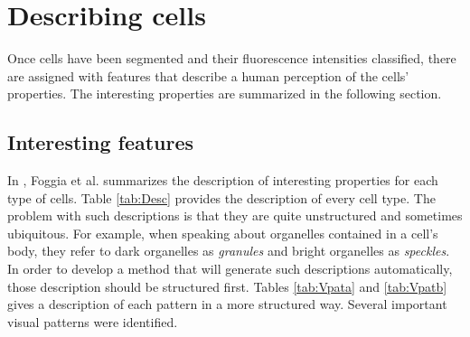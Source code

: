 
\chapter{Describing cells} %

\label{Chapter6} %


Once cells have been segmented and their fluorescence intensities classified, there are assigned with features that describe a human perception of the cells' properties. The interesting properties are summarized in the following section. 



\section{Interesting features}

In \cite{FoggiaBenchmarks2013}, Foggia et al. summarizes the description of interesting properties for each type of cells. Table \ref{tab:Desc} provides the description of every cell type. The problem with such descriptions is that they are quite unstructured and sometimes ubiquitous. For example, when speaking about organelles contained in a cell's body, they refer to dark organelles as \textit{granules} and bright organelles as \textit{speckles}. \\

In order to develop a method that will generate such descriptions automatically, those description should be structured first. Tables \ref{tab:Vpata} and \ref{tab:Vpatb} gives a description of each pattern in a more structured way. Several important visual patterns were identified. 




